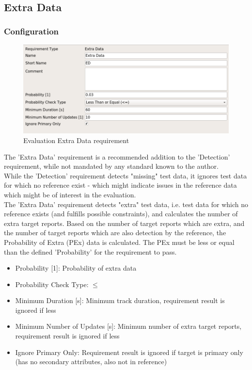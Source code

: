 \subsection{Extra Data}
\label{sec:eval_req_extra_data} 

\subsubsection{Configuration}

\begin{figure}[H]
    \includegraphics[width=14cm,frame]{../screenshots/eval_req_extra_data.png}
  \caption{Evaluation Extra Data requirement}
\end{figure}

The 'Extra Data' requirement is a recommended addition to the 'Detection' requirement, while not mandated by any standard known to the author. \\

While the 'Detection' requirement detects "missing" test data, it ignores test data for which no reference exist - which might indicate issues in the reference data which might be of interest in the evaluation. \\

The 'Extra Data' requirement detects "extra" test data, i.e. test data for which no reference exists (and fulfills possible constraints), and calculates the number of extra target reports. Based on the number of target reports which are extra, and the number of target reports which are also detection by the reference, the Probability of Extra (PEx) data is calculated. The PEx must be less or equal than the defined 'Probability' for the requirement to pass. \\

\begin{itemize}  
\item Probability [1]: Probability of extra data
\item Probability Check Type: $\leq$
\item Minimum Duration [s]: Minimum track duration, requirement result is ignored if less
\item Minimum Number of Updates [s]: Minimum number of extra target reports, requirement result is ignored if less
\item Ignore Primary Only: Requirement result is ignored if target is primary only (has no secondary attributes, also not in reference)
\end{itemize}

